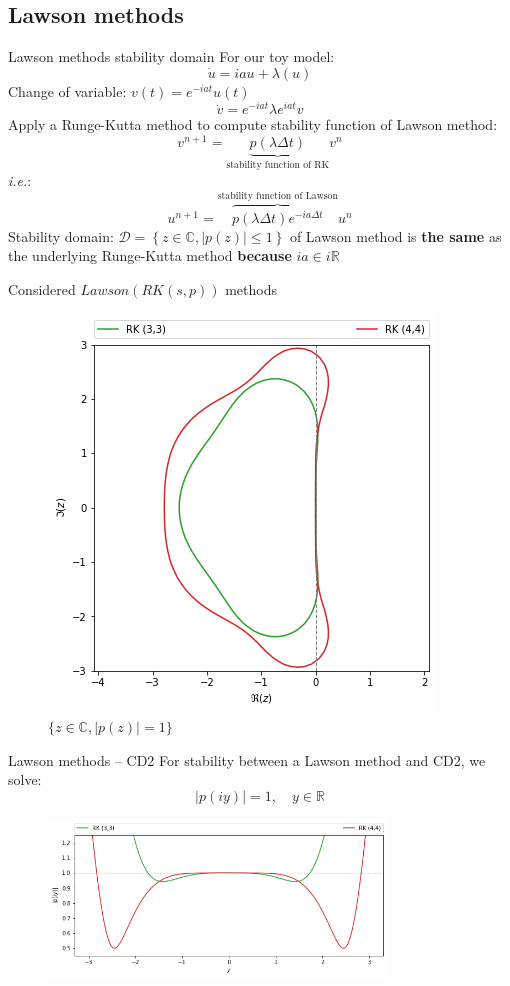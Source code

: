 \documentclass{beamer}
\begin{document}
\subsection{Lawson methods}
\begin{frame}{Lawson methods stability domain}
  For our toy model:
  $$
    \dot{u} = iau + \lambda(u)
  $$
  Change of variable: $v(t) = e^{-iat}u(t)$
  $$
    \dot{v} = e^{-iat}\lambda e^{iat}v
  $$
  Apply a Runge-Kutta method to compute stability function of Lawson method:
  $$
    v^{n+1} = \underbrace{p(\lambda\Delta t)}_{\text{stability function of RK}}v^n
  $$
  \emph{i.e.}:
  $$
    u^{n+1} = \overbrace{p(\lambda\Delta t)e^{-ia\Delta t}}^{\text{stability function of Lawson}}u^n
  $$
  Stability domain: $\mathcal{D}=\left\{z\in\mathbb{C},|p(z)|\leq 1\right\}$ of Lawson method is \textbf{the same} as the underlying Runge-Kutta method \textbf{because} $ia\in i\mathbb{R}$
\end{frame}
\begin{frame}{Considered $Lawson(RK(s,p))$ methods}
  \begin{figure}\centering
    \includegraphics[height=0.75\textheight]{img/rk_sd.png}
    \caption{$\{z\in\mathbb{C},|p(z)|=1\}$}
  \end{figure}
\end{frame}
\begin{frame}{Lawson methods -- CD2}
  For stability between a Lawson method and CD2, we solve:
  $$
    |p(iy)| = 1,\quad y\in\mathbb{R}
  $$
  \begin{figure}\centering
    \includegraphics[width=0.8\textwidth]{img/yaxis.png}
  \end{figure}
\end{frame}
\end{document}
